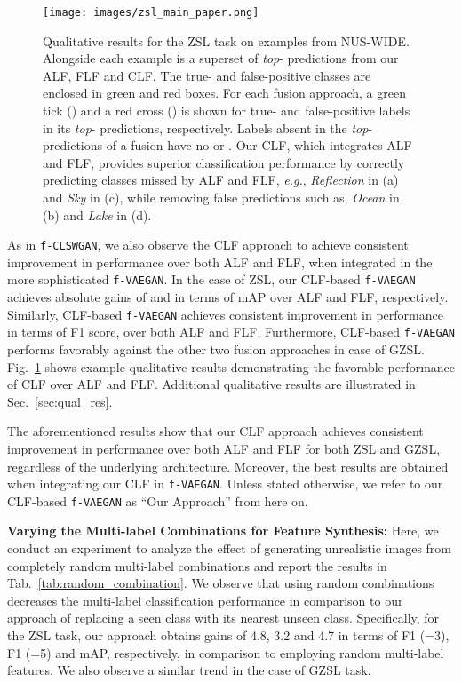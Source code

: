 \documentclass[10pt,journal,compsoc]{IEEEtran}
\newcommand{\xmark}{\ding{55}}
\newcommand{\clswgan}{\texttt{f-CLSWGAN}}
\newcommand{\vaegan}{\texttt{f-VAEGAN}}
\begin{document}
\begin{figure}
    \centering
    \texttt{[image: images/zsl\_main\_paper.png]}
    \caption{Qualitative results for the ZSL task on examples from NUS-WIDE. Alongside each example is a superset of \textit{top}- predictions from our ALF, FLF and CLF. The true- and false-positive classes are enclosed in green and red boxes. For each fusion approach, a green tick ({\color{ForestGreen}}) and a red cross ({\color{red}\xmark}) is shown for true- and false-positive labels in its \textit{top}- predictions, respectively. Labels absent in the \textit{top}- predictions of a fusion have no {\color{ForestGreen}} or {\color{red}\xmark}.
Our CLF, which integrates ALF and FLF, provides superior classification performance by correctly predicting classes missed by ALF and FLF, \textit{e.g.}, \textit{Reflection} in (a) and \textit{Sky} in (c), while removing false predictions such as, \textit{Ocean} in (b) and \textit{Lake} in (d).\vspace{-0.2cm}}
    \label{fig:clf_zsl_example}
\end{figure}

As in \clswgan{}, we also observe the CLF approach to achieve consistent improvement in performance over both ALF and FLF, when integrated in the more sophisticated \vaegan{}. In the case of ZSL, our CLF-based \vaegan{} achieves absolute gains of  and  in terms of mAP over ALF and FLF, respectively. Similarly, CLF-based \vaegan{} achieves consistent improvement in performance in terms of F1 score, over both ALF and FLF. Furthermore, CLF-based \vaegan{}  performs favorably against the other two fusion approaches in case of GZSL. Fig.~\ref{fig:clf_zsl_example} shows example qualitative results demonstrating the favorable performance of CLF over ALF and FLF. Additional qualitative results are illustrated in Sec.~\ref{sec:qual_res}.




The aforementioned results show that our CLF approach achieves consistent improvement in performance over both ALF and FLF for both ZSL and GZSL, regardless of the underlying architecture. Moreover, the best results are obtained when integrating our CLF in \vaegan{}. 
Unless stated otherwise, we refer to our CLF-based \vaegan{} as ``Our Approach'' from here on.



\noindent\textbf{Varying the Multi-label Combinations for Feature Synthesis:} Here, we conduct an experiment to analyze the effect of generating unrealistic images from  completely random multi-label combinations and report the results in Tab.~\ref{tab:random_combination}. We observe that using random combinations decreases the multi-label classification performance in comparison to our approach of replacing a seen class with its nearest unseen class. Specifically, for the ZSL task, our approach obtains gains of 4.8, 3.2 and 4.7 in terms of F1 (=3), F1 (=5) and mAP, respectively, in comparison to employing random multi-label features. We also observe a similar trend in the case of GZSL task.
\end{document}
